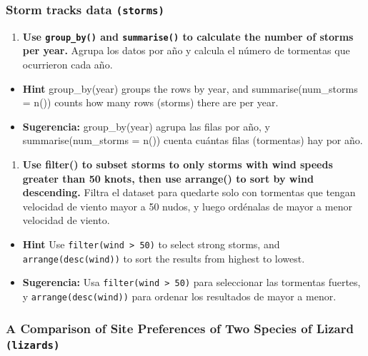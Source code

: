 \documentclass[
]{article}
\providecommand{\tightlist}{%
  \setlength{\itemsep}{0pt}\setlength{\parskip}{0pt}}
\begin{document}
\subsubsection{\texorpdfstring{\textbf{Storm tracks data
\texttt{(storms)}}}{Storm tracks data (storms)}}\label{storm-tracks-data-storms}

\begin{enumerate}
\def\labelenumi{\arabic{enumi}.}
\setcounter{enumi}{2}
\tightlist
\item
  \textbf{Use \texttt{group\_by()} and \texttt{summarise()} to calculate
  the number of storms per year.} Agrupa los datos por año y calcula el
  número de tormentas que ocurrieron cada año.
\end{enumerate}

\begin{itemize}
\tightlist
\item
  \textbf{Hint} group\_by(year) groups the rows by year, and
  summarise(num\_storms = n()) counts how many rows (storms) there are
  per year.
\item
  \textbf{Sugerencia:} group\_by(year) agrupa las filas por año, y
  summarise(num\_storms = n()) cuenta cuántas filas (tormentas) hay por
  año.
\end{itemize}

\begin{enumerate}
\def\labelenumi{\arabic{enumi}.}
\setcounter{enumi}{3}
\tightlist
\item
  \textbf{Use filter() to subset storms to only storms with wind speeds
  greater than 50 knots, then use arrange() to sort by wind descending.}
  Filtra el dataset para quedarte solo con tormentas que tengan
  velocidad de viento mayor a 50 nudos, y luego ordénalas de mayor a
  menor velocidad de viento.
\end{enumerate}

\begin{itemize}
\tightlist
\item
  \textbf{Hint} Use \texttt{filter(wind\ \textgreater{}\ 50)} to select
  strong storms, and \texttt{arrange(desc(wind))} to sort the results
  from highest to lowest.
\item
  \textbf{Sugerencia:} Usa \texttt{filter(wind\ \textgreater{}\ 50)}
  para seleccionar las tormentas fuertes, y \texttt{arrange(desc(wind))}
  para ordenar los resultados de mayor a menor.
\end{itemize}

\subsubsection{\texorpdfstring{\textbf{A Comparison of Site Preferences
of Two Species of Lizard
\texttt{(lizards)}}}{A Comparison of Site Preferences of Two Species of Lizard (lizards)}}\label{a-comparison-of-site-preferences-of-two-species-of-lizard-lizards}
\end{document}
